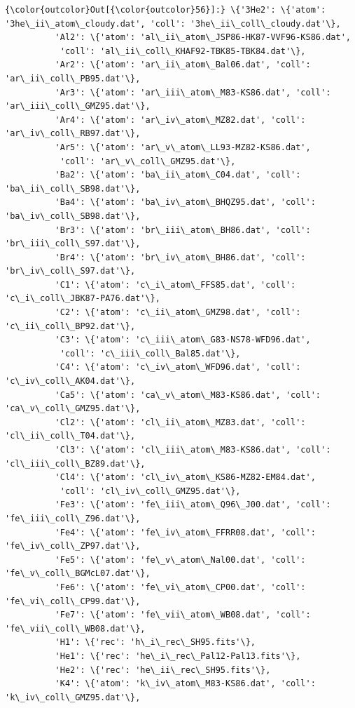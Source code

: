 \documentclass[11pt]{article}
\begin{document}
            \begin{Verbatim}[commandchars=\\\{\}]
{\color{outcolor}Out[{\color{outcolor}56}]:} \{'3He2': \{'atom': '3he\_ii\_atom\_cloudy.dat', 'coll': '3he\_ii\_coll\_cloudy.dat'\},
          'Al2': \{'atom': 'al\_ii\_atom\_JSP86-HK87-VVF96-KS86.dat',
           'coll': 'al\_ii\_coll\_KHAF92-TBK85-TBK84.dat'\},
          'Ar2': \{'atom': 'ar\_ii\_atom\_Bal06.dat', 'coll': 'ar\_ii\_coll\_PB95.dat'\},
          'Ar3': \{'atom': 'ar\_iii\_atom\_M83-KS86.dat', 'coll': 'ar\_iii\_coll\_GMZ95.dat'\},
          'Ar4': \{'atom': 'ar\_iv\_atom\_MZ82.dat', 'coll': 'ar\_iv\_coll\_RB97.dat'\},
          'Ar5': \{'atom': 'ar\_v\_atom\_LL93-MZ82-KS86.dat',
           'coll': 'ar\_v\_coll\_GMZ95.dat'\},
          'Ba2': \{'atom': 'ba\_ii\_atom\_C04.dat', 'coll': 'ba\_ii\_coll\_SB98.dat'\},
          'Ba4': \{'atom': 'ba\_iv\_atom\_BHQZ95.dat', 'coll': 'ba\_iv\_coll\_SB98.dat'\},
          'Br3': \{'atom': 'br\_iii\_atom\_BH86.dat', 'coll': 'br\_iii\_coll\_S97.dat'\},
          'Br4': \{'atom': 'br\_iv\_atom\_BH86.dat', 'coll': 'br\_iv\_coll\_S97.dat'\},
          'C1': \{'atom': 'c\_i\_atom\_FFS85.dat', 'coll': 'c\_i\_coll\_JBK87-PA76.dat'\},
          'C2': \{'atom': 'c\_ii\_atom\_GMZ98.dat', 'coll': 'c\_ii\_coll\_BP92.dat'\},
          'C3': \{'atom': 'c\_iii\_atom\_G83-NS78-WFD96.dat',
           'coll': 'c\_iii\_coll\_Bal85.dat'\},
          'C4': \{'atom': 'c\_iv\_atom\_WFD96.dat', 'coll': 'c\_iv\_coll\_AK04.dat'\},
          'Ca5': \{'atom': 'ca\_v\_atom\_M83-KS86.dat', 'coll': 'ca\_v\_coll\_GMZ95.dat'\},
          'Cl2': \{'atom': 'cl\_ii\_atom\_MZ83.dat', 'coll': 'cl\_ii\_coll\_T04.dat'\},
          'Cl3': \{'atom': 'cl\_iii\_atom\_M83-KS86.dat', 'coll': 'cl\_iii\_coll\_BZ89.dat'\},
          'Cl4': \{'atom': 'cl\_iv\_atom\_KS86-MZ82-EM84.dat',
           'coll': 'cl\_iv\_coll\_GMZ95.dat'\},
          'Fe3': \{'atom': 'fe\_iii\_atom\_Q96\_J00.dat', 'coll': 'fe\_iii\_coll\_Z96.dat'\},
          'Fe4': \{'atom': 'fe\_iv\_atom\_FFRR08.dat', 'coll': 'fe\_iv\_coll\_ZP97.dat'\},
          'Fe5': \{'atom': 'fe\_v\_atom\_Nal00.dat', 'coll': 'fe\_v\_coll\_BGMcL07.dat'\},
          'Fe6': \{'atom': 'fe\_vi\_atom\_CP00.dat', 'coll': 'fe\_vi\_coll\_CP99.dat'\},
          'Fe7': \{'atom': 'fe\_vii\_atom\_WB08.dat', 'coll': 'fe\_vii\_coll\_WB08.dat'\},
          'H1': \{'rec': 'h\_i\_rec\_SH95.fits'\},
          'He1': \{'rec': 'he\_i\_rec\_Pal12-Pal13.fits'\},
          'He2': \{'rec': 'he\_ii\_rec\_SH95.fits'\},
          'K4': \{'atom': 'k\_iv\_atom\_M83-KS86.dat', 'coll': 'k\_iv\_coll\_GMZ95.dat'\},

\end{Verbatim}
\end{document}
